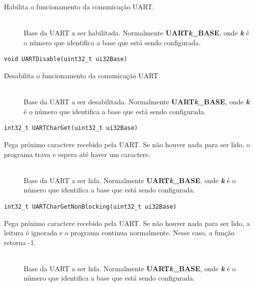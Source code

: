 Habilita o funcionamento da comunicação UART.

\begin{description}
	\item []\hfill \\
	Base da UART a ser habilitada. Normalmente \textbf{UART\emph{k}\_BASE}, onde \textbf{\emph{k}} é o número que identifica a base que está sendo configurada.
\end{description}

\begin{lstlisting}[style=funcao]
	void UARTDisable(uint32_t ui32Base)
\end{lstlisting}

Desabilita o funcionamento da comunicação UART.

\begin{description}
	\item []\hfill \\
	Base da UART a ser desabilitada. Normalmente \textbf{UART\emph{k}\_BASE}, onde \textbf{\emph{k}} é o número que identifica a base que está sendo configurada.
\end{description}

\begin{lstlisting}[style=funcao]
	int32_t UARTCharGet(uint32_t ui32Base)
\end{lstlisting}

Pega próximo caractere recebido pela UART. Se não houver nada para ser lido, o programa trava e espera até haver um caractere.

\begin{description}
	\item []\hfill \\
	Base da UART a ser lida. Normalmente \textbf{UART\emph{k}\_BASE}, onde \textbf{\emph{k}} é o número que identifica a base que está sendo configurada.
\end{description}

\begin{lstlisting}[style=funcao]
	int32_t UARTCharGetNonBlocking(uint32_t ui32Base)
\end{lstlisting}

Pega próximo caractere recebido pela UART. Se não houver nada para ser lido, a leitura é ignorada e o programa continua normalmente. Nesse caso, a função retorna -1.

\begin{description}
	\item []\hfill \\
	Base da UART a ser lida. Normalmente \textbf{UART\emph{k}\_BASE}, onde \textbf{\emph{k}} é o número que identifica a base que está sendo configurada.
\end{description}

